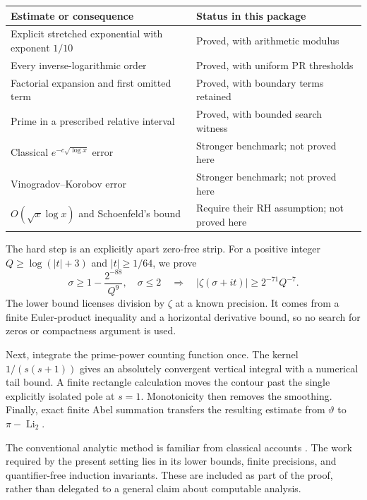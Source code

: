 \documentclass[11pt,letterpaper]{article}
\numberwithin{equation}{section}
\theoremstyle{definition}
\newcommand{\Li}{\operatorname{Li}}
\begin{document}
\begin{center}
\begin{tabular}{@{}p{}p{}@{}}
\toprule
Estimate or consequence & Status in this package\\
\midrule
Explicit stretched exponential with exponent $1/10$ & Proved, with arithmetic modulus\\
Every inverse-logarithmic order & Proved, with uniform PR thresholds\\
Factorial expansion and first omitted term & Proved, with boundary terms retained\\
Prime in a prescribed relative interval & Proved, with bounded search witness\\
Classical $e^{-c\sqrt{\log x}}$ error & Stronger benchmark; not proved here\\
Vinogradov--Korobov error & Stronger benchmark; not proved here\\
$O(\sqrt x\log x)$ and Schoenfeld's bound & Require their RH assumption; not proved here\\
\bottomrule
\end{tabular}
\end{center}

The hard step is an explicitly apart zero-free strip. For a positive
integer $Q\ge\log(|t|+3)$ and $|t|\ge1/64$, we prove
\[
 \sigma\ge1-\frac{2^{-88}}{Q^9},\quad \sigma\le2
 \quad\Longrightarrow\quad
 |\zeta(\sigma+it)|\ge2^{-71}Q^{-7}.
\]
The lower bound licenses division by $\zeta$ at a known precision.
It comes from a finite Euler-product inequality and a horizontal
derivative bound, so no search for zeros or compactness argument is used.

Next, integrate the prime-power counting function once. The kernel
$1/(s(s+1))$ gives an absolutely convergent vertical integral with a
numerical tail bound. A finite rectangle calculation moves the contour
past the single explicitly isolated pole at $s=1$. Monotonicity then
removes the smoothing. Finally, exact finite Abel summation transfers
the resulting estimate from $\vartheta$ to $\pi-\Li_2$.

The conventional analytic method is familiar from classical accounts
\cite{Kontorovich,Tao}. The work required by the present setting lies
in its lower bounds, finite precisions, and quantifier-free induction
invariants. These are included as part of the proof, rather than delegated
to a general claim about computable analysis.







\end{document}
